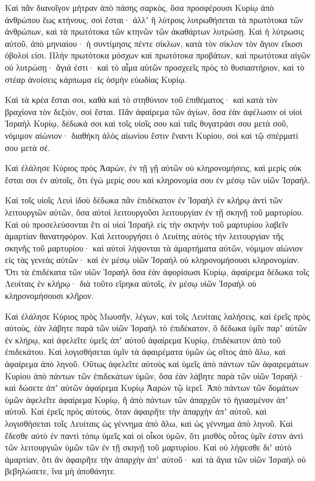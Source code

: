 {Καὶ πᾶν διανοῖγον μήτραν ἀπὸ πάσης σαρκὸς, ὅσα προσφέρουσι Κυρίῳ ἀπὸ ἀνθρώπου ἕως κτήνους, σοὶ ἔσται· ἀλλʼ ἢ λύτροις λυτρωθήσεται τὰ πρωτότοκα τῶν ἀνθρώπων, καὶ τὰ πρωτότοκα τῶν κτηνῶν τῶν ἀκαθάρτων λυτρώσῃ.
Καὶ ἡ λύτρωσις αὐτοῦ, ἀπὸ μηνιαίου· ἡ συντίμησις πέντε σίκλων, κατὰ τὸν σίκλον τὸν ἅγιον εἴκοσι ὀβολοί εἰσι.
Πλὴν πρωτότοκα μόσχων καὶ πρωτότοκα προβάτων, καὶ πρωτότοκα αἰγῶν οὐ λυτρώσῃ· ἅγιά ἐστι· καὶ τὸ αἷμα αὐτῶν προσχεεῖς πρὸς τὸ θυσιαστήριον, καὶ τὸ στέαρ ἀνοίσεις κάρπωμα εἰς ὀσμὴν εὐωδίας Κυρίῳ.
\par }{\PP {}Καὶ τὰ κρέα ἔσται σοι, καθὰ καὶ τὸ στηθύνιον τοῦ ἐπιθέματος· καὶ κατὰ τὸν βραχίονα τὸν δεξιὸν, σοὶ ἔσται.
Πᾶν ἀφαίρεμα τῶν ἁγίων, ὅσα ἐὰν ἀφέλωσιν οἱ υἱοὶ Ἰσραὴλ Κυρίῳ, δέδωκά σοι καὶ τοῖς υἱοῖς σου καὶ ταῖς θυγατράσι σου μετὰ σοῦ, νόμιμον αἰώνιον· διαθήκη ἁλὸς αἰωνίου ἔστιν ἔναντι Κυρίου, σοὶ καὶ τῷ σπέρματί σου μετὰ σέ.
\par }{\PP {}Καὶ ἐλάλησε Κύριος πρὸς Ἀαρὼν, ἐν τῇ γῇ αὐτῶν οὐ κληρονομήσεις, καὶ μερὶς οὐκ ἔσται σοι ἐν αὐτοῖς, ὅτι ἐγὼ μερίς σου καὶ κληρονομία σου ἐν μέσῳ τῶν υἱῶν Ἰσραήλ.
\par }{\PP {}Καὶ τοῖς υἱοῖς Λευὶ ἰδοὺ δέδωκα πᾶν ἐπιδέκατον ἐν Ἰσραὴλ ἐν κλήρῳ ἀντὶ τῶν λειτουργιῶν αὐτῶν, ὅσα αὐτοὶ λειτουργοῦσι λειτουργίαν ἐν τῇ σκηνῇ τοῦ μαρτυρίου.
Καὶ οὐ προσελεύσονται ἔτι οἱ υἱοὶ Ἰσραὴλ εἰς τὴν σκηνὴν τοῦ μαρτυρίου λαβεῖν ἁμαρτίαν θανατηφόρον.
Καὶ λειτουργήσει ὁ Λευίτης αὐτὸς τὴν λειτουργίαν τῆς σκηνῆς τοῦ μαρτυρίου· καὶ αὐτοὶ λήψονται τὰ ἁμαρτήματα αὐτῶν, νόμιμον αἰώνιον εἰς τὰς γενεὰς αὐτῶν· καὶ ἐν μέσῳ υἱῶν Ἰσραὴλ οὐ κληρονομήσουσι κληρονομίαν.
Ὅτι τὰ ἐπιδέκατα τῶν υἱῶν Ἰσραὴλ ὅσα ἐὰν ἀφορίσωσι Κυρίῳ, ἀφαίρεμα δέδωκα τοῖς Λευίταις ἐν κλήρῳ· διὰ τοῦτο εἴρηκα αὐτοῖς, ἐν μέσῳ υἱῶν Ἰσραὴλ οὐ κληρονομήσουσι κλῆρον.
\par }{\PP {}Καὶ ἐλάλησε Κύριος πρὸς Μωυσῆν, λέγων,
καὶ τοῖς Λευίταις λαλήσεις, καὶ ἐρεῖς πρὸς αὐτοὺς, ἐὰν λάβητε παρὰ τῶν υἱῶν Ἰσραὴλ τὸ ἐπιδέκατον, ὃ δέδωκα ὑμῖν παρʼ αὐτῶν ἐν κλήρῳ, καὶ ἀφελεῖτε ὑμεῖς ἀπʼ αὐτοῦ ἀφαίρεμα Κυρίῳ, ἐπιδέκατον ἀπὸ τοῦ ἐπιδεκάτου.
Καὶ λογισθήσεται ὑμῖν τὰ ἀφαιρέματα ὑμῶν ὡς σῖτος ἀπὸ ἅλω, καὶ ἀφαίρεμα ἀπὸ ληνοῦ.
Οὕτως ἀφελεῖτε αὐτοὺς καὶ ὑμεῖς ἀπὸ πάντων τῶν ἀφαιρεμάτων Κυρίου ἀπὸ πάντων τῶν ἐπιδεκάτων ὑμῶν, ὅσα ἐὰν λάβητε παρὰ τῶν υἱῶν Ἰσραήλ· καὶ δώσετε ἀπʼ αὐτῶν ἀφαίρεμα Κυρίῳ Ἀαρὼν τῷ ἱερεῖ.
Ἀπὸ πάντων τῶν δομάτων ὑμῶν ἀφελεῖτε ἀφαίρεμα Κυρίῳ, ἢ ἀπὸ πάντων τῶν ἀπαρχῶν τὸ ἡγιασμένον ἀπʼ αὐτοῦ.
Καὶ ἐρεῖς πρὸς αὐτοὺς, ὅταν ἀφαιρῆτε τὴν ἀπαρχὴν ἀπʼ αὐτοῦ, καὶ λογισθήσεται τοῖς Λευίταις ὡς γέννημα ἀπὸ ἅλω, καὶ ὡς γέννημα ἀπὸ ληνοῦ.
Καὶ ἔδεσθε αὐτὸ ἐν παντὶ τόπῳ ὑμεῖς καὶ οἱ οἶκοι ὑμῶν, ὅτι μισθὸς οὗτος ὑμῖν ἐστιν ἀντὶ τῶν λειτουργιῶν ὑμῶν τῶν ἐν τῇ σκηνῇ τοῦ μαρτυρίου.
Καὶ οὐ λήψεσθε διʼ αὐτὸ ἁμαρτίαν, ὅτι ἂν ἀφαιρῆτε τὴν ἀπαρχὴν ἀπʼ αὐτοῦ· καὶ τὰ ἅγια τῶν υἱῶν Ἰσραὴλ οὐ βεβηλώσετε, ἵνα μὴ ἀποθάνητε.

}
